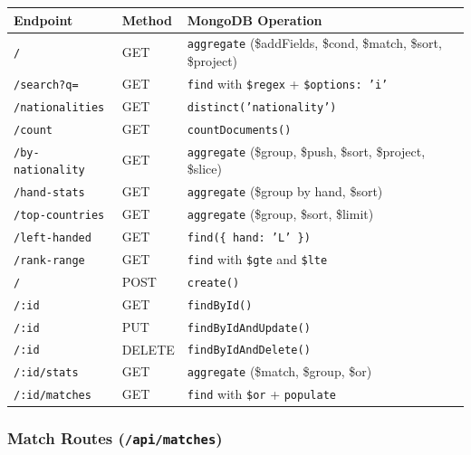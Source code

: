 \documentclass[12pt,a4paper]{article}
\begin{document}
\begin{longtable}{|p{4.5cm}|l|p{5cm}|}
    \hline
    \textbf{Endpoint} & \textbf{Method} & \textbf{MongoDB Operation} \\
    \hline
    \endhead
    \texttt{/} & GET & \texttt{aggregate} (\$addFields, \$cond, \$match, \$sort, \$project) \\
    \hline
    \texttt{/search?q=} & GET & \texttt{find} with \texttt{\$regex} + \texttt{\$options: 'i'} \\
    \hline
    \texttt{/nationalities} & GET & \texttt{distinct('nationality')} \\
    \hline
    \texttt{/count} & GET & \texttt{countDocuments()} \\
    \hline
    \texttt{/by-nationality} & GET & \texttt{aggregate} (\$group, \$push, \$sort, \$project, \$slice) \\
    \hline
    \texttt{/hand-stats} & GET & \texttt{aggregate} (\$group by hand, \$sort) \\
    \hline
    \texttt{/top-countries} & GET & \texttt{aggregate} (\$group, \$sort, \$limit) \\
    \hline
    \texttt{/left-handed} & GET & \texttt{find(\{ hand: 'L' \})} \\
    \hline
    \texttt{/rank-range} & GET & \texttt{find} with \texttt{\$gte} and \texttt{\$lte} \\
    \hline
    \texttt{/} & POST & \texttt{create()} \\
    \hline
    \texttt{/:id} & GET & \texttt{findById()} \\
    \hline
    \texttt{/:id} & PUT & \texttt{findByIdAndUpdate()} \\
    \hline
    \texttt{/:id} & DELETE & \texttt{findByIdAndDelete()} \\
    \hline
    \texttt{/:id/stats} & GET & \texttt{aggregate} (\$match, \$group, \$or) \\
    \hline
    \texttt{/:id/matches} & GET & \texttt{find} with \texttt{\$or} + \texttt{populate} \\
    \hline
\end{longtable}

\newpage
\subsubsection{Match Routes (\texttt{/api/matches})}
\end{document}
